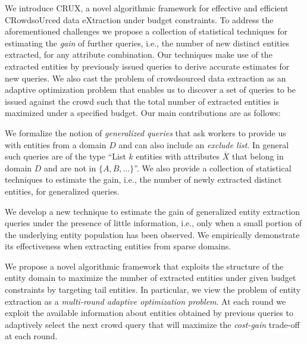 We introduce CRUX, a novel algorithmic framework for effective and efficient CRowdsoUrced data eXtraction under budget constraints. To address the aforementioned challenges we propose a collection of  statistical techniques for estimating the {\em gain} of further queries, i.e., the number of new distinct entities extracted, for any attribute combination. Our techniques make use of the extracted entities by previously issued queries to derive accurate estimates for new queries. We also cast the problem of crowdsourced data extraction as an adaptive optimization problem that enables us to discover a set of queries to be issued against the crowd such that the total number of extracted entities is maximized under a specified budget. Our main contributions are as follows:
\squishlist
\item We formalize the notion of {\em generalized queries} that ask workers to provide us with entities from a domain $D$ and can also include an {\em exclude list}. In general such queries are of the type ``List $k$ entities with attributes $\bar{X}$ that belong in domain $D$ and are not in $\{A, B, ...\}$''.  We also provide a collection of statistical techniques to estimate the gain, i.e., the number of newly extracted distinct entities, for generalized queries. 
\item We develop a new technique to estimate the gain of generalized entity extraction queries under the presence of little information, i.e., only when a small portion of the underlying entity population has been observed. We empirically demonstrate its effectiveness when extracting entities from sparse domains.
\item We propose a novel algorithmic framework that exploits the structure of the entity domain to maximize the number of extracted entities under given budget constraints by targeting tail entities. In particular, we view the problem of entity extraction as a {\em multi-round adaptive optimization problem}. At  each round we exploit the available information about entities obtained by previous queries to adaptively select the next crowd query that will maximize the {\em cost-gain} trade-off at each round. 
\squishend
{}

